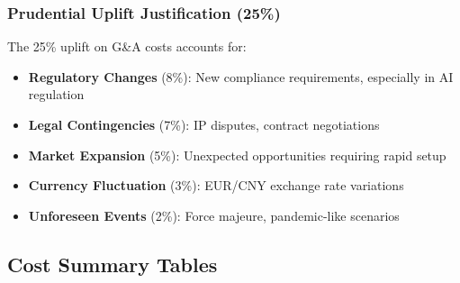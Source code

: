 \documentclass[11pt, a4paper, oneside]{article}
\begin{document}
\subsubsection{Prudential Uplift Justification (25\%)}
The 25\% uplift on G\&A costs accounts for:
\begin{itemize}
    \item \textbf{Regulatory Changes} (8\%): New compliance requirements, especially in AI regulation
    \item \textbf{Legal Contingencies} (7\%): IP disputes, contract negotiations
    \item \textbf{Market Expansion} (5\%): Unexpected opportunities requiring rapid setup
    \item \textbf{Currency Fluctuation} (3\%): EUR/CNY exchange rate variations
    \item \textbf{Unforeseen Events} (2\%): Force majeure, pandemic-like scenarios
\end{itemize}

\subsection{Cost Summary Tables}
\end{document}
